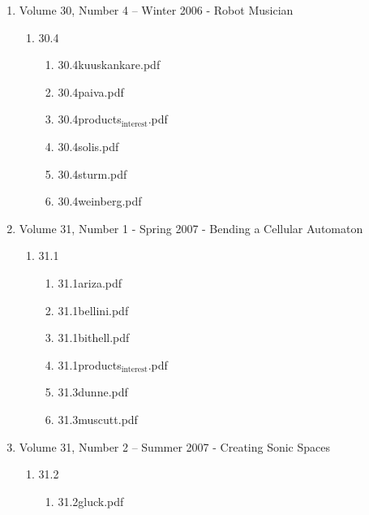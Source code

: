 \documentclass[11pt]{article}
\begin{document}
\begin{enumerate}
\begin{enumerate}
\item Volume 30, Number 4 – Winter 2006 - Robot Musician
\label{sec-1-1-1-1-11-19-19-5}
\begin{enumerate}
\item 30.4
\label{sec-1-1-1-1-11-19-19-5-1}
\begin{enumerate}
\item 30.4kuuskankare.pdf
\label{sec-1-1-1-1-11-19-19-5-1-1}

\item 30.4paiva.pdf
\label{sec-1-1-1-1-11-19-19-5-1-2}

\item 30.4products$_{\text{interest}}$.pdf
\label{sec-1-1-1-1-11-19-19-5-1-3}

\item 30.4solis.pdf
\label{sec-1-1-1-1-11-19-19-5-1-4}

\item 30.4sturm.pdf
\label{sec-1-1-1-1-11-19-19-5-1-5}

\item 30.4weinberg.pdf
\label{sec-1-1-1-1-11-19-19-5-1-6}
\end{enumerate}
\end{enumerate}

\item Volume 31, Number 1 - Spring 2007 - Bending a Cellular Automaton
\label{sec-1-1-1-1-11-19-19-6}
\begin{enumerate}
\item 31.1
\label{sec-1-1-1-1-11-19-19-6-1}
\begin{enumerate}
\item 31.1ariza.pdf
\label{sec-1-1-1-1-11-19-19-6-1-1}

\item 31.1bellini.pdf
\label{sec-1-1-1-1-11-19-19-6-1-2}

\item 31.1bithell.pdf
\label{sec-1-1-1-1-11-19-19-6-1-3}

\item 31.1products$_{\text{interest}}$.pdf
\label{sec-1-1-1-1-11-19-19-6-1-4}

\item 31.3dunne.pdf
\label{sec-1-1-1-1-11-19-19-6-1-5}

\item 31.3muscutt.pdf
\label{sec-1-1-1-1-11-19-19-6-1-6}
\end{enumerate}
\end{enumerate}

\item Volume 31, Number 2 – Summer 2007 - Creating Sonic Spaces
\label{sec-1-1-1-1-11-19-19-7}
\begin{enumerate}
\item 31.2
\label{sec-1-1-1-1-11-19-19-7-1}
\begin{enumerate}
\item 31.2gluck.pdf
\label{sec-1-1-1-1-11-19-19-7-1-1}


\end{enumerate}
\end{enumerate}
\end{enumerate}
\end{enumerate}
\end{document}
